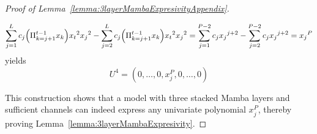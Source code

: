 \begin{proof}[Proof of Lemma~\ref{lemma:3layerMambaExpresivityAppendix}]
\begin{itemize}
    \begin{equation}
    \small
    \sum_{j=1}^L c_j \Big{(} \Pi_{k=j+1}^{t-1} x_k \Big{)} {x_t}^2 {x_j}^2 - \sum_{j=2}^L c_j \Big{(} \Pi_{k=j+1}^{t-1} x_k \Big{)} {x_t}^2 {x_j}^2 
%
    =\sum_{j=1}^{P-2} c_j {x_j}^{j+2} - \sum_{j=2}^{P-2} c_j {x_j}^{j+2} = {x_j}^{P}
\end{equation}
yields
   \[
    U^4 = \left(0, \dots, 0, x_j^P, 0, \dots, 0\right)
    \]
\end{itemize}

This construction shows that a model with three stacked Mamba layers and sufficient channels can indeed express any univariate polynomial \( x_j^P \), thereby proving Lemma~\ref{lemma:3layerMambaExpresivity}.

\end{proof}
